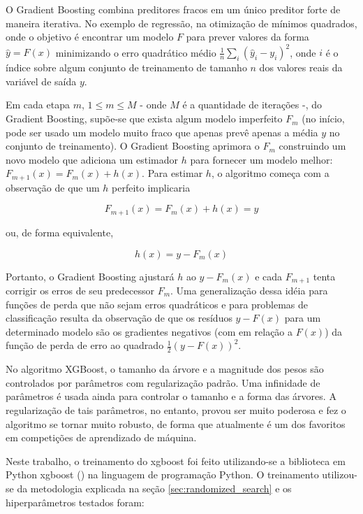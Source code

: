 O Gradient Boosting combina preditores fracos em um único preditor forte de maneira iterativa. No exemplo de regressão, na otimização de mínimos quadrados, onde o objetivo é encontrar um modelo $ F $ para prever valores da forma $ \hat{y} = F(x) $ minimizando o erro quadrático médio $ \tfrac{1}{n} \sum_{i} ({\hat{y}}_{i}-y_{i})^{2} $, onde $ i $ é o índice sobre algum conjunto de treinamento de tamanho $ n $ dos valores reais da variável de saída $ y $.

Em cada etapa $ m $, $ 1 \leq m \leq M $ - onde $ M $ é a quantidade de iterações -, do Gradient Boosting, supõe-se que exista algum modelo imperfeito $ F_{m} $ (no início, pode ser usado um modelo muito fraco que apenas prevê apenas a média $ y $ no conjunto de treinamento). O Gradient Boosting aprimora o $ F_{m} $ construindo um novo modelo que adiciona um estimador $ h $ para fornecer um modelo melhor: $ F_{m + 1}(x) = F_{m}(x) + h(x) $. Para estimar $ h $, o algoritmo começa com a observação de que um $ h $ perfeito implicaria

\begin{equation}
F_{m + 1}(x) = F_{m}(x) + h(x) = y
\end{equation}

ou, de forma equivalente,

\begin{equation}
h(x) = y - F_{m}(x)
\end{equation}

Portanto, o Gradient Boosting ajustará $ h $ ao $ y - F_{m}(x) $ e cada $ F_{m + 1} $ tenta corrigir os erros de seu predecessor $ F_{m} $. Uma generalização dessa idéia para funções de perda que não sejam erros quadráticos e para problemas de classificação resulta da observação de que os resíduos $ y - F(x) $ para um determinado modelo são os gradientes negativos (com em relação a $ F(x) $) da função de perda de erro ao quadrado $ \frac{1}{2} (y - F(x))^{2} $.

No algoritmo XGBoost, o tamanho da árvore e a magnitude dos pesos são controlados por parâmetros com regularização padrão. Uma infinidade de parâmetros é usada ainda para controlar o tamanho e a forma das árvores. A regularização de tais parâmetros, no entanto, provou ser muito poderosa e fez o algoritmo se tornar muito robusto, de forma que atualmente é um dos favoritos em competições de aprendizado de máquina.

Neste trabalho, o treinamento do xgboost foi feito utilizando-se a biblioteca em Python xgboost (\citet{Xgboost}) na linguagem de programação Python. O treinamento utilizou-se da metodologia explicada na seção \ref{sec:randomized_search} e os hiperparâmetros testados foram:

